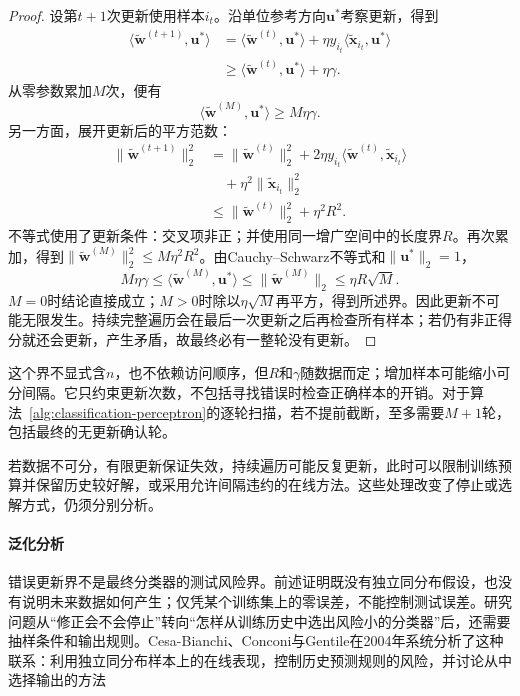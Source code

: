 \begin{proof}
  设第$t+1$次更新使用样本$i_t$。沿单位参考方向$\bm{u}^\ast$考察更新，得到
  \begin{align*}
    \langle\tilde{\bm{w}}^{(t+1)},\bm{u}^\ast\rangle
      &=\langle\tilde{\bm{w}}^{(t)},\bm{u}^\ast\rangle
        +\eta y_{i_t}\langle\tilde{\bm{x}}_{i_t},\bm{u}^\ast\rangle\\
      &\geq\langle\tilde{\bm{w}}^{(t)},\bm{u}^\ast\rangle+\eta\gamma .
  \end{align*}
  从零参数累加$M$次，便有
  \[
    \langle\tilde{\bm{w}}^{(M)},\bm{u}^\ast\rangle
      \geq M\eta\gamma .
  \]
  另一方面，展开更新后的平方范数：
  \begin{align*}
    \|\tilde{\bm{w}}^{(t+1)}\|_2^2
      &=\|\tilde{\bm{w}}^{(t)}\|_2^2
        +2\eta y_{i_t}
          \langle\tilde{\bm{w}}^{(t)},\tilde{\bm{x}}_{i_t}\rangle\\
      &\quad+\eta^2\|\tilde{\bm{x}}_{i_t}\|_2^2\\
      &\leq\|\tilde{\bm{w}}^{(t)}\|_2^2+\eta^2R^2 .
  \end{align*}
  不等式使用了更新条件：交叉项非正；并使用同一增广空间中的长度界$R$。再次累加，得到$\|\tilde{\bm{w}}^{(M)}\|_2^2\leq M\eta^2R^2$。由Cauchy--Schwarz不等式和$\|\bm{u}^\ast\|_2=1$，
  \[
    M\eta\gamma
      \leq\langle\tilde{\bm{w}}^{(M)},\bm{u}^\ast\rangle
      \leq\|\tilde{\bm{w}}^{(M)}\|_2
      \leq\eta R\sqrt{M}.
  \]
  $M=0$时结论直接成立；$M>0$时除以$\eta\sqrt M$再平方，得到所述界。因此更新不可能无限发生。持续完整遍历会在最后一次更新之后再检查所有样本；若仍有非正得分就还会更新，产生矛盾，故最终必有一整轮没有更新。
\end{proof}

这个界不显式含$n$，也不依赖访问顺序，但$R$和$\gamma$随数据而定；增加样本可能缩小可分间隔。它只约束更新次数，不包括寻找错误时检查正确样本的开销。对于算法~\ref{alg:classification-perceptron}的逐轮扫描，若不提前截断，至多需要$M+1$轮，包括最终的无更新确认轮。

若数据不可分，有限更新保证失效，持续遍历可能反复更新，此时可以限制训练预算并保留历史较好解，或采用允许间隔违约的在线方法。这些处理改变了停止或选解方式，仍须分别分析。

\paragraph{泛化分析}
错误更新界不是最终分类器的测试风险界。前述证明既没有独立同分布假设，也没有说明未来数据如何产生；仅凭某个训练集上的零误差，不能控制测试误差。研究问题从“修正会不会停止”转向“怎样从训练历史中选出风险小的分类器”后，还需要抽样条件和输出规则。Cesa-Bianchi、Conconi与Gentile在2004年系统分析了这种联系：利用独立同分布样本上的在线表现，控制历史预测规则的风险，并讨论从中选择输出的方法

